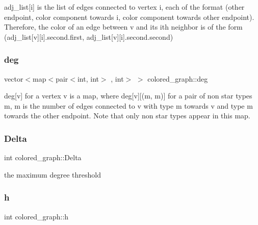 adj\+\_\+list\mbox{[}i\mbox{]} is the list of edges connected to vertex i, each of the format (other endpoint, color component towards i, color component towards other endpoint). Therefore, the color of an edge between v and its ith neighbor is of the form (adj\+\_\+list\mbox{[}v\mbox{]}\mbox{[}i\mbox{]}.second.\+first, adj\+\_\+list\mbox{[}v\mbox{]}\mbox{[}i\mbox{]}.second.\+second) 

\mbox{\label{classcolored__graph_ae3269d35c1b022bc70d195bebd4e1b8a}} 
\subsubsection{\texorpdfstring{deg}{deg}}
{\footnotesize\ttfamily vector$<$map$<$pair$<$int, int$>$ , int$>$ $>$ colored\+\_\+graph\+::deg}



deg\mbox{[}v\mbox{]} for a vertex v is a map, where deg\mbox{[}v\mbox{]}\mbox{[}(m, m\textquotesingle{})\mbox{]} for a pair of non star types m, m\textquotesingle{} is the number of edges connected to v with type m towards v and type m\textquotesingle{} towards the other endpoint. Note that only non star types appear in this map. 

\mbox{\label{classcolored__graph_a5b0e93eb40a20dc815c809dee11edc12}} 
\subsubsection{\texorpdfstring{Delta}{Delta}}
{\footnotesize\ttfamily int colored\+\_\+graph\+::\+Delta}



the maximum degree threshold 

\mbox{\label{classcolored__graph_ae27062a4ee59df2670d3a0c81e85a3fa}} 
\subsubsection{\texorpdfstring{h}{h}}
{\footnotesize\ttfamily int colored\+\_\+graph\+::h}



